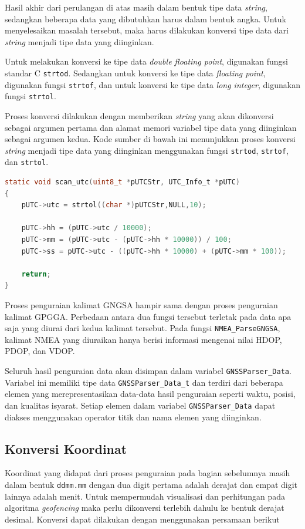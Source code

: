 Hasil akhir dari perulangan di atas masih dalam bentuk tipe data \textit{string}, sedangkan beberapa data yang dibutuhkan harus dalam bentuk angka. Untuk menyelesaikan masalah tersebut, maka harus dilakukan konversi tipe data dari \textit{string} menjadi tipe data yang diinginkan.

Untuk melakukan konversi ke tipe data \textit{double floating point}, digunakan fungsi standar C \texttt{strtod}. Sedangkan untuk konversi ke tipe data \textit{floating point}, digunakan fungsi \texttt{strtof}, dan untuk konversi ke tipe data \textit{long integer}, digunakan fungsi \texttt{strtol}.

Proses konversi dilakukan dengan memberikan \textit{string} yang akan dikonversi sebagai argumen pertama dan alamat memori variabel tipe data yang diinginkan sebagai argumen kedua. Kode sumber di bawah ini menunjukkan proses konversi \textit{string} menjadi tipe data yang diinginkan menggunakan fungsi \texttt{strtod}, \texttt{strtof}, dan \texttt{strtol}.

\begin{lstlisting}[language=c]
static void scan_utc(uint8_t *pUTCStr, UTC_Info_t *pUTC)
{
	pUTC->utc = strtol((char *)pUTCStr,NULL,10);
	
	pUTC->hh = (pUTC->utc / 10000);
	pUTC->mm = (pUTC->utc - (pUTC->hh * 10000)) / 100;
	pUTC->ss = pUTC->utc - ((pUTC->hh * 10000) + (pUTC->mm * 100));
	
	return;
}
\end{lstlisting}

Proses penguraian kalimat GNGSA hampir sama dengan proses penguraian kalimat GPGGA. Perbedaan antara dua fungsi tersebut terletak pada data apa saja yang diurai dari kedua kalimat tersebut. Pada fungsi \texttt{NMEA\_ParseGNGSA}, kalimat NMEA yang diuraikan hanya berisi informasi mengenai nilai HDOP, PDOP, dan VDOP.

Seluruh hasil penguraian data akan disimpan dalam variabel \texttt{GNSSParser\_Data}. Variabel ini memiliki tipe data \texttt{GNSSParser\_Data\_t} dan terdiri dari beberapa elemen yang merepresentasikan data-data hasil penguraian seperti waktu, posisi, dan kualitas isyarat. Setiap elemen dalam variabel \texttt{GNSSParser\_Data} dapat diakses menggunakan operator titik dan nama elemen yang diinginkan.

\subsection{Konversi Koordinat}
Koordinat yang didapat dari proses penguraian pada bagian sebelumnya masih dalam bentuk \texttt{ddmm.mm} dengan dua digit pertama adalah derajat dan empat digit lainnya adalah menit. Untuk mempermudah visualisasi dan perhitungan pada algoritma \textit{geofencing} maka perlu dikonversi terlebih dahulu ke bentuk derajat desimal. Konversi dapat dilakukan dengan menggunakan persamaan berikut

